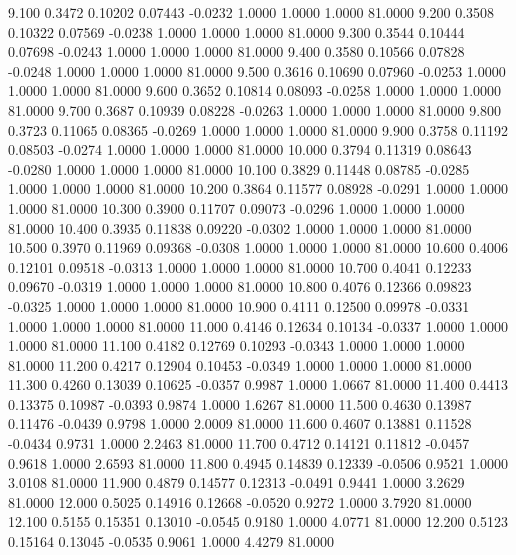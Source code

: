    9.100   0.3472   0.10202   0.07443  -0.0232   1.0000   1.0000   1.0000  81.0000
   9.200   0.3508   0.10322   0.07569  -0.0238   1.0000   1.0000   1.0000  81.0000
   9.300   0.3544   0.10444   0.07698  -0.0243   1.0000   1.0000   1.0000  81.0000
   9.400   0.3580   0.10566   0.07828  -0.0248   1.0000   1.0000   1.0000  81.0000
   9.500   0.3616   0.10690   0.07960  -0.0253   1.0000   1.0000   1.0000  81.0000
   9.600   0.3652   0.10814   0.08093  -0.0258   1.0000   1.0000   1.0000  81.0000
   9.700   0.3687   0.10939   0.08228  -0.0263   1.0000   1.0000   1.0000  81.0000
   9.800   0.3723   0.11065   0.08365  -0.0269   1.0000   1.0000   1.0000  81.0000
   9.900   0.3758   0.11192   0.08503  -0.0274   1.0000   1.0000   1.0000  81.0000
  10.000   0.3794   0.11319   0.08643  -0.0280   1.0000   1.0000   1.0000  81.0000
  10.100   0.3829   0.11448   0.08785  -0.0285   1.0000   1.0000   1.0000  81.0000
  10.200   0.3864   0.11577   0.08928  -0.0291   1.0000   1.0000   1.0000  81.0000
  10.300   0.3900   0.11707   0.09073  -0.0296   1.0000   1.0000   1.0000  81.0000
  10.400   0.3935   0.11838   0.09220  -0.0302   1.0000   1.0000   1.0000  81.0000
  10.500   0.3970   0.11969   0.09368  -0.0308   1.0000   1.0000   1.0000  81.0000
  10.600   0.4006   0.12101   0.09518  -0.0313   1.0000   1.0000   1.0000  81.0000
  10.700   0.4041   0.12233   0.09670  -0.0319   1.0000   1.0000   1.0000  81.0000
  10.800   0.4076   0.12366   0.09823  -0.0325   1.0000   1.0000   1.0000  81.0000
  10.900   0.4111   0.12500   0.09978  -0.0331   1.0000   1.0000   1.0000  81.0000
  11.000   0.4146   0.12634   0.10134  -0.0337   1.0000   1.0000   1.0000  81.0000
  11.100   0.4182   0.12769   0.10293  -0.0343   1.0000   1.0000   1.0000  81.0000
  11.200   0.4217   0.12904   0.10453  -0.0349   1.0000   1.0000   1.0000  81.0000
  11.300   0.4260   0.13039   0.10625  -0.0357   0.9987   1.0000   1.0667  81.0000
  11.400   0.4413   0.13375   0.10987  -0.0393   0.9874   1.0000   1.6267  81.0000
  11.500   0.4630   0.13987   0.11476  -0.0439   0.9798   1.0000   2.0009  81.0000
  11.600   0.4607   0.13881   0.11528  -0.0434   0.9731   1.0000   2.2463  81.0000
  11.700   0.4712   0.14121   0.11812  -0.0457   0.9618   1.0000   2.6593  81.0000
  11.800   0.4945   0.14839   0.12339  -0.0506   0.9521   1.0000   3.0108  81.0000
  11.900   0.4879   0.14577   0.12313  -0.0491   0.9441   1.0000   3.2629  81.0000
  12.000   0.5025   0.14916   0.12668  -0.0520   0.9272   1.0000   3.7920  81.0000
  12.100   0.5155   0.15351   0.13010  -0.0545   0.9180   1.0000   4.0771  81.0000
  12.200   0.5123   0.15164   0.13045  -0.0535   0.9061   1.0000   4.4279  81.0000
